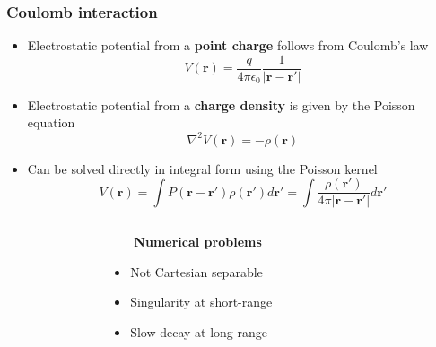 \begin{frame}
    \frametitle{Coulomb interaction}
    \scriptsize
    \begin{itemize}
	\item	Electrostatic potential from a \textbf{point charge} follows from Coulomb's law
		\begin{equation}
		    \nonumber
		    V(\boldsymbol{r}) = \frac{q}{4\pi\epsilon_0}
		    \frac{1}{|\boldsymbol{r}-\boldsymbol{r}'|}
		\end{equation}
		\vspace{2mm}
	\item	Electrostatic potential from a \textbf{charge density} is given by the Poisson equation
		\begin{equation}
		    \nonumber
		    \nabla^2 V(\boldsymbol{r}) = -\rho(\boldsymbol{r})
		\end{equation}
		\vspace{2mm}
	\item	Can be solved directly in integral form using the Poisson kernel
		\begin{equation}
		    \nonumber
		    V(\boldsymbol{r}) = 
		    \int P(\boldsymbol{r}-\boldsymbol{r'})\rho(\boldsymbol{r'}) d\boldsymbol{r'} =
		    \int\frac{\rho(\boldsymbol{r'})}{4\pi|\boldsymbol{r} - \boldsymbol{r'}|} d\boldsymbol{r'} 
		\end{equation}
		\vspace{2mm}
    \end{itemize}
    \begin{columns}
    \begin{column}{.30\textwidth}
    \end{column}
    \begin{column}{.40\textwidth}
        \ \ \ \ \textbf{Numerical problems}
        \begin{itemize}
	    \item Not Cartesian separable
	    \item Singularity at short-range
	    \item Slow decay at long-range
	\end{itemize}
    \end{column}
    \begin{column}{.30\textwidth}
    \end{column}
    \end{columns}
\end{frame}

